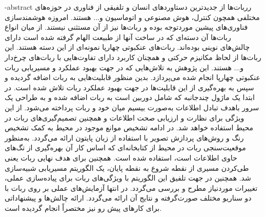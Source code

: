 

\fa-abstract{
رربات‌ها از جدیدترین دستاورد‌های انسان و تلفیقی از فناوری در حوزه‌‌های مختلفی همچون کنترل، هوش مصنوعی و اتوماسیون و... هستند. امروزه هوشمندسازی فناوری‌های پیشین موردتوجه بوده و ربات‌ها نیز از آن مستثنی نیستند. از میان انواع ربات‌ها آن دسته‌ای که در ساخت آنها از طبیعت الهام گرفته شده است دارای چالش‌های نوینی بوده‌اند. ربات‌های عنکبوتی چهارپا نمونه‌ای از این دسته هستند. این ربات‌ها از لحاظ مکانیزم حرکتی و همچنان کاربرد‌ دارای تفاوت‌هایی با ربات‌های چرخ‌دار و... هستند.
این پژوهش به تلاش‌هایی که در جهت بهبود عملکرد و مسیریابی ربات عنکبوتی چهارپا انجام شده می‌پردازد. بدین منظور قابلیت‌هایی به ربات اضافه گردیده و سپس به بهره‌گیری از این قابلیت‌ها در جهت بهبود عملکرد ربات تلاش شده است. در ابتدا یک ماژول چندجانبه که شامل دوربین است به ربات اضافه شده و به طراحی یک سرور باهدف تبادل اطلاعات به‌صورت بیسیم میان خود و ربات پرداخته می‌شود. از این ویژگی برای نظارت و ارزیابی صحت اطلاعات و همچنین تصمیم‌گیری‌های ربات در محیط استفاده خواهد شد. در ادامه تشخیص موانع موجود در محیط به کمک تشخیص رنگ و روش‌های پردازش تصویر با استفاده از زبان پایتون ارائه می‌گردد.
به‌منظور موقعیت‌سنجی ربات در محیط از کتابخانه‌ای که اساس کار آن بهره‌گیری از تگ‌های حاوی اطلاعات است، استفاده شده است.
همچنین برای هدف نهایی ربات یعنی طی‌کردن مسیری از نقطه شروع به نقطه پایان، یک الگوریتم مسیر‌یابی شبیه‌‌سازی شد. همچنین در جهت تلفیق این الگوریتم با ویژگی‌های ربات برای پیاده‌سازی عملی، تغییرات موردنیاز مطرح و بررسی می‌گردد.
در انتها آزمایش‌های عملی بر روی ربات با دو سناریو مختلف صورت‌گرفته و نتایج آن ارائه می‌گردد. ارائه چالش‌ها و پیشنهاداتی برای کارهای پیش ‌رو نیز مختصراً انجام گردیده است.		
}


